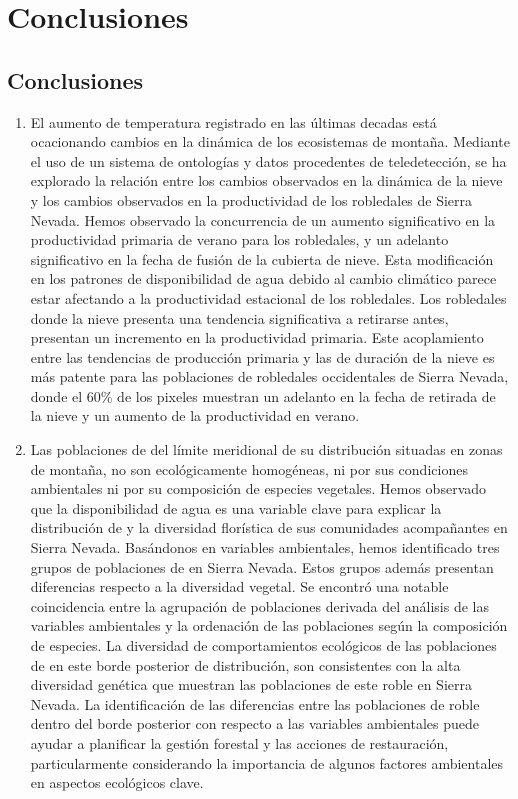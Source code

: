 %
\chapter{\textcolor{ctcolormain}{Conclusiones}}\label{sec:conclussions}
\newpage

\section{Conclusiones}\label{sec:conclussions:spa}

\begin{enumerate}
\renewcommand{\labelenumi}{\textbf{\textcolor{ctcolormain}{\arabic{enumi}.}}}
    \item El aumento de temperatura registrado en las últimas decadas está ocacionando cambios en la dinámica de los ecosistemas de montaña. Mediante el uso de un sistema de ontologías y datos procedentes de teledetección, se ha explorado la relación entre los cambios observados en la dinámica de la nieve y los cambios observados en la productividad de los robledales de Sierra Nevada. Hemos observado la concurrencia de un aumento significativo en la productividad primaria de verano para los robledales, y un adelanto significativo en la fecha de fusión de la cubierta de nieve. Esta modificación en los patrones de disponibilidad de agua debido al cambio climático parece estar afectando a la productividad estacional de los robledales. Los robledales donde la nieve presenta una tendencia significativa a retirarse antes, presentan un incremento en la productividad primaria. Este acoplamiento entre las tendencias de producción primaria y las de duración de la nieve es más patente para las poblaciones de robledales occidentales de Sierra Nevada, donde el 60\% de los pixeles muestran un adelanto en la fecha de retirada de la nieve y un aumento de la productividad en verano. 
    
    \item Las poblaciones de \Qpy del límite meridional de su distribución situadas en zonas de montaña, no son ecológicamente homogéneas, ni por sus condiciones ambientales ni por su composición de especies vegetales. Hemos observado que la disponibilidad de agua es una variable clave para explicar la distribución de \Qp y la diversidad florística de sus comunidades acompañantes en Sierra Nevada. Basándonos en variables ambientales, hemos identificado tres grupos de poblaciones de \Qp en Sierra Nevada. Estos grupos además presentan diferencias respecto a la diversidad vegetal. Se encontró una notable coincidencia entre la agrupación de poblaciones derivada del análisis de las variables ambientales y la ordenación de las poblaciones según la composición de especies. La diversidad de comportamientos ecológicos de las poblaciones de \Qp en este borde posterior de distribución, son consistentes con la alta diversidad genética que muestran las poblaciones de este roble en Sierra Nevada. La identificación de las diferencias entre las poblaciones de roble dentro del borde posterior con respecto a las variables ambientales puede ayudar a planificar la gestión forestal y las acciones de restauración, particularmente considerando la importancia de algunos factores ambientales en aspectos ecológicos clave.
    

\end{enumerate}
